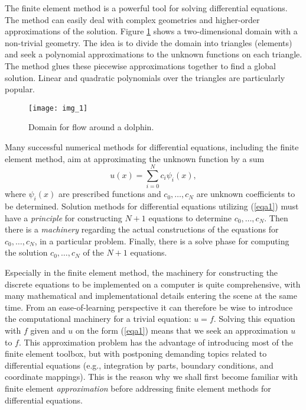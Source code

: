 \documentclass[../main.tex]{subfiles}
\begin{document}
	
The finite element method is a powerful tool for solving differential equations.
The method can easily deal with complex geometries and higher-order approximations of the solution. Figure \ref{fig:img_1} shows a two-dimensional domain with a non-trivial
geometry. The idea is to divide the domain into triangles (elements) and seek
a polynomial approximations to the unknown functions on each triangle. The
method glues these piecewise approximations together to find a global solution.
Linear and quadratic polynomials over the triangles are particularly popular.

\begin{figure}[H]
	\centering
	\texttt{[image: img\_1]}
	\caption{Domain for flow around a dolphin.}
	\label{fig:img_1}
\end{figure}

Many successful numerical methods for differential equations, including the finite element method, aim at approximating the unknown function by a sum
\begin{equation}\label{eqa1}
	u(x)=\sum_{i=0}^{N} c_{i} \psi_{i}(x),
\end{equation}
where $\psi_{i}(x)$ are prescribed functions and $c_{0}, \ldots, c_{N}$ are unknown coefficients to be determined. Solution methods for differential equations utilizing (\ref{eqa1}) must have a \textit{principle} for constructing $N+1$ equations to determine $c_{0}, \ldots, c_{N}$. Then there is a \textit{machinery} regarding the actual constructions of the equations for $c_{0}, \ldots, c_{N}$, in a particular problem. Finally, there is a solve phase for computing the solution $c_{0}, \ldots, c_{N}$ of the $N+1$ equations.

Especially in the finite element method, the machinery for constructing the discrete equations to be implemented on a computer is quite comprehensive, with many mathematical and implementational details entering the scene at the same time. From an ease-of-learning perspective it can therefore be wise to introduce the computational machinery for a trivial equation: $u=f$. Solving this equation with $f$ given and $u$ on the form (\ref{eqa1}) means that we seek an approximation $u$ to $f$. This approximation problem has the advantage of introducing most of the finite element toolbox, but with postponing demanding topics related to differential equations (e.g., integration by parts, boundary conditions, and coordinate mappings). This is the reason why we shall first become familiar with finite element \textit{approximation} before addressing finite element methods for differential equations.
\end{document}

